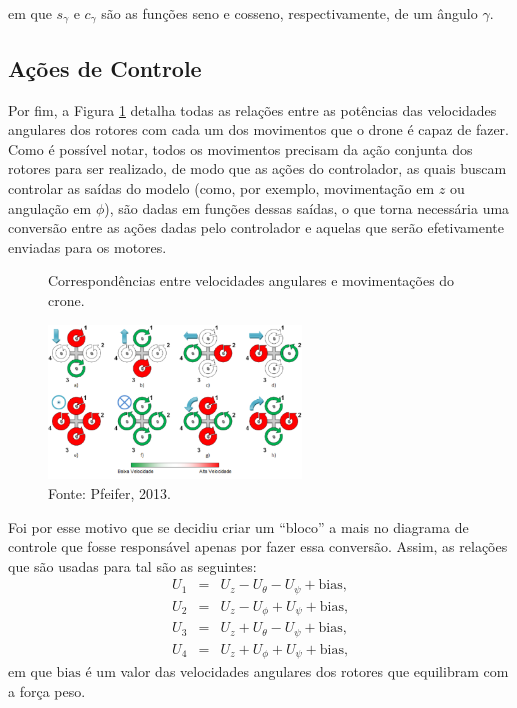 \vspace{+0.3cm}

\noindent em que $s_{\gamma}$ e $c_{\gamma}$ são as funções seno e cosseno, respectivamente, de um ângulo $\gamma$.

\subsection{Ações de Controle \label{sec:ac_control}}

Por fim, a Figura \ref{fig:movimento} detalha todas as relações entre as potências das velocidades angulares 
dos rotores com cada um dos movimentos que o drone é capaz de fazer.
Como é possível notar, todos os movimentos precisam da ação conjunta dos rotores para ser realizado, de modo que 
as ações do controlador, as quais buscam controlar as saídas do modelo (como, por exemplo, movimentação em $z$ ou 
angulação em $\phi$), são dadas em funções dessas saídas, o que torna necessária uma conversão entre as ações dadas 
pelo controlador e aquelas que serão efetivamente enviadas para os motores.
\begin{figure}[h!]
    \centering
    \caption{Correspondências entre velocidades angulares e movimentações do crone.}
    \includegraphics[width=0.6\textwidth]{figs/mov_drone.png}
    \caption*{\footnotesize{Fonte: Pfeifer, 2013. \cite{usp}}} \vspace{-0.9cm}
    \label{fig:movimento}
\end{figure}

Foi por esse motivo que se decidiu criar 
um ``bloco'' a mais no diagrama de controle que fosse responsável apenas por fazer essa conversão. Assim, as relações 
que são usadas para tal são as seguintes:
\begin{eqnarray}
    U_1 &=& U_z - U_\theta - U_\psi + \text{bias,} \\
    U_2 &=& U_z - U_\phi + U_\psi + \text{bias,} \\
    U_3 &=& U_z + U_\theta - U_\psi + \text{bias,} \\
    U_4 &=& U_z + U_\phi + U_\psi + \text{bias,}
\end{eqnarray}
\noindent em que $\text{bias}$ é um valor das velocidades angulares dos rotores que equilibram com a força peso.